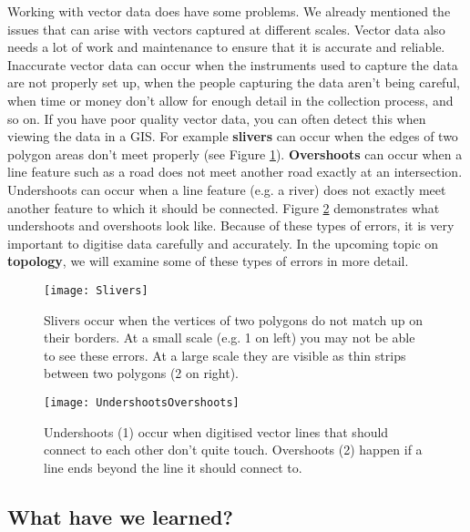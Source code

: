 Working with vector data does have some problems. We already mentioned the
issues that can arise with vectors captured at different scales. Vector data
also needs a lot of work and maintenance to ensure that it is accurate and
reliable. Inaccurate vector data can occur when the instruments used to
capture the data are not properly set up, when the people capturing the data
aren't being careful, when time or money don't allow for enough detail in the
collection process, and so on. If you have poor quality vector data, you can
often detect this when viewing the data in a GIS. For example
\textbf{slivers} can
occur when the edges of two polygon areas don't meet properly (see Figure
\ref{fig:slivers}). \textbf{Overshoots} can occur when a line feature such as a
road does not meet another road exactly at an intersection. Undershoots can
occur when a line feature (e.g. a river) does not exactly meet another
feature to which it should be connected. Figure \ref{fig:undershoots}
demonstrates
what undershoots and overshoots look like. Because of these types of errors,
it is very important to digitise data carefully and accurately. In the
upcoming topic on \textbf{topology}, we will examine some of these types of
errors in more detail.

\begin{figure}[ht]
   \begin{center}
   \caption{Slivers occur when the vertices of two polygons do not match
    up on their borders. At a small scale (e.g. 1 on left) you may not be
    able to see these errors. At a large scale they are visible as thin
    strips between two polygons (2 on right).}
\label{fig:slivers}\smallskip
   \texttt{[image: Slivers]}
\end{center}
\end{figure}

\begin{figure}[ht]
   \begin{center}
   \caption{Undershoots (1) occur when digitised vector lines that should
    connect to each other don't quite touch. Overshoots (2) happen if a line
    ends beyond the line it should connect to.}
\label{fig:undershoots}\smallskip
   \texttt{[image: UndershootsOvershoots]}
\end{center}
\end{figure}

\subsection{What have we learned?}

